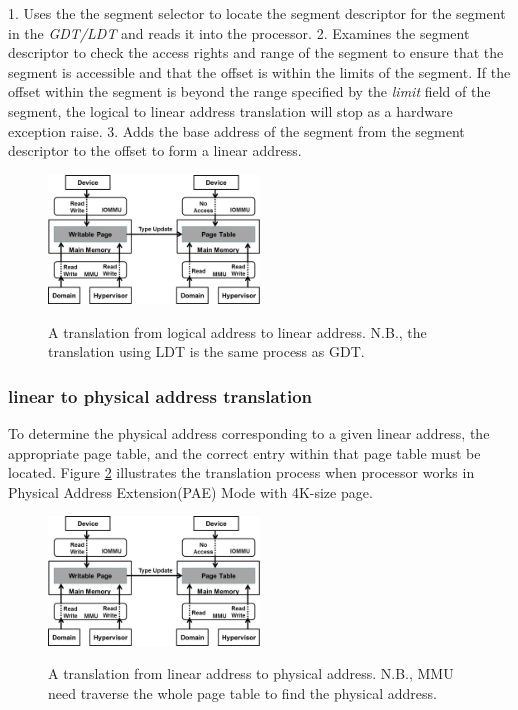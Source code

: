 1. Uses the the segment selector to locate the segment descriptor for the segment in the \emph{GDT/LDT} and reads it into the processor.
2. Examines the segment descriptor to check the access rights and range of the segment to ensure that the segment is accessible and that the offset is within the limits of the segment. If the offset within the segment is beyond the range specified by the \emph{limit} field of the segment, the logical to linear address translation will stop as a hardware exception raise.
3. Adds the base address of the segment from the segment descriptor to the offset to form a linear address.

\begin{figure}[ht]
\centering
\includegraphics[width=0.5\textwidth]{image/translation/log2lin.png} \\
\caption{A translation from logical address to linear address. N.B., the translation using LDT is the same process as GDT.}
\label{fig:log2lin}
\end{figure}

\subsubsection{linear to physical address translation}
To determine the physical address corresponding to a given linear address, the appropriate page table, and the correct entry within that page table must be located. Figure \ref{fig:lin2phy} illustrates the translation process when processor works in Physical Address Extension(PAE) Mode with 4K-size page.

\begin{figure}[ht]
\centering
\includegraphics[width=0.5\textwidth]{image/translation/lin2phy.png} \\
\caption{A translation from linear address to physical address. N.B., MMU need traverse the whole page table to find the physical address.}
\label{fig:lin2phy}
\end{figure}

